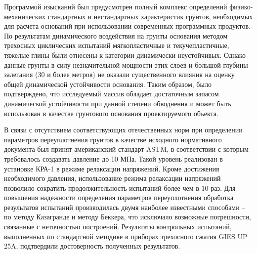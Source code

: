  Программой изысканий был предусмотрен полный комплекс определений физико-механических стандартных и нестандартных характеристик грунтов, необходимых для расчета оснований при использовании современных программных продуктов. По результатам динамического воздействия на грунты основания методом трехосных циклических испытаний мягкопластичные и текучепластичные, тяжелые глины были отнесены к категории динамически неустойчивых. Однако данные грунты в силу незначительной мощности этих слоев и большой глубины залегания (30 и более метров) не оказали существенного влияния на оценку общей динамической устойчивости основания. Таким образом, было подтверждено, что исследуемый массив обладает достаточным запасом динамической устойчивости при данной степени обводнения и может быть использован в качестве грунтового основания проектируемого объекта.

В связи с отсутствием соответствующих отечественных норм при определении параметров переуплотнения грунтов в качестве исходного нормативного документа был принят американский стандарт ASTM, в соответствии с которым требовалось создавать давление до 10 МПа. Такой уровень реализован в установке КРА-1 в режиме релаксации напряжений. Кроме достижения необходимого давления, использование режима релаксации напряжений позволило сократить продолжительность испытаний более чем в 10 раз. 
Для повышения надежности определения параметров переуплотнения обработка результатов испытаний производилась двумя наиболее известными способами – по методу Казагранде и методу Беккера, что исключало возможные погрешности, связанные с неточностью построений. Результаты контрольных испытаний, выполненных по стандартной методике в приборах трехосного сжатия GIES UP 25A, подтвердили достоверность полученных результатов.
